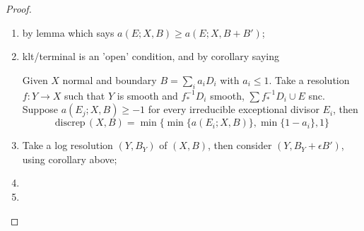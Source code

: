 \documentclass{article}
\begin{document}
\begin{proof}
	\begin{enumerate}
		\item by lemma which says $ a(E;X,B)\geqslant a(E;X,B+B') $;
		\item klt/terminal is an 'open' condition, and by corollary saying
		
		Given  $ X $ normal and boundary $ B=\sum_ia_iD_i $ with $ a_i\leqslant 1 $. Take a resolution $ f:Y\to X $ such that $ Y $ is smooth and $ f^{-1}_*D_i $ smooth, $ \sum f^{-1}_*D_i \cup E$ snc. Suppose $ a(E_j;X,B)\geqslant -1 $ for every irreducible exceptional divisor $ E_i $, then
		$$ \mathrm{discrep}\, (X,B)=\min\{\min\{a(E_i;X,B)\},\min\{1-a_i\},1\} $$
		\item Take a log resolution $ (Y,B_Y) $ of $ (X,B) $, then consider $ (Y,B_Y+\epsilon B') $, using corollary above;
		\item 
		\item  
	\end{enumerate}
\end{proof}





\end{document}
